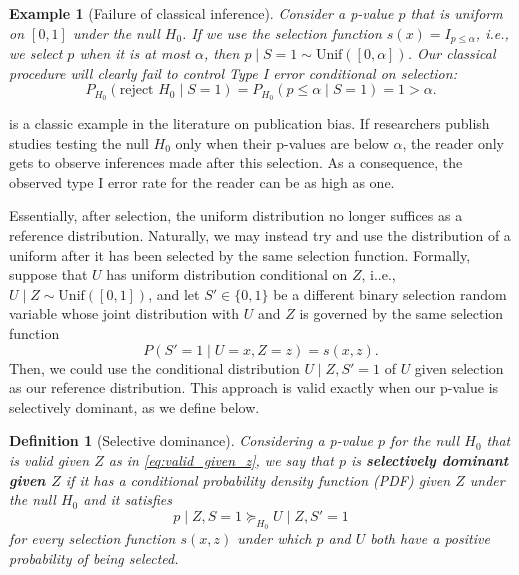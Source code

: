 \documentclass{article}
\newtheorem{example}{Example}
\newtheorem{definition}{Definition}
\begin{document}
\begin{example}[Failure of classical inference]
\label{exm:publication_bias}
Consider a p-value $p$ that is uniform on $[0, 1]$ under the null $H_0$. If we use the selection function $s(x) = I_{p \leq \alpha}$, i.e., we select $p$ when it is at most $\alpha$, then $p \mid S=1 \sim \text{Unif}([0, \alpha])$. Our classical procedure will clearly fail to control Type I error conditional on selection:
\begin{equation*}
    P_{H_0}(\text{reject } H_0 \mid S=1) = P_{H_0}(p \leq \alpha \mid S=1) = 1 > \alpha. 
\end{equation*}
\end{example}

 is a classic example in the literature on publication bias. If researchers publish studies testing the null $H_0$ only when their p-values are below $\alpha$, the reader only gets to observe inferences made after this selection. As a consequence, the observed type I error rate for the reader can be as high as one. 

Essentially, after selection, the uniform distribution no longer suffices as a reference distribution. Naturally, we may instead try and use the distribution of a uniform after it has been selected by the same selection function. Formally, suppose that $U$ has uniform distribution conditional on $Z$, i..e., $U \mid Z \sim \text{Unif}([0, 1])$, and let $S' \in \{0, 1\}$ be a different binary selection random variable whose joint distribution with $U$ and $Z$ is governed by the same selection function 
\begin{equation*}
     P(S' = 1 \mid U = x, Z=z ) = s(x, z).
\end{equation*}
Then, we could use the conditional distribution $U \mid Z,  S' = 1$ of $U$ given selection as our reference distribution. This approach is valid exactly when our p-value is selectively dominant, as we define below. 

\begin{definition}[Selective dominance]
    \label{def:selective_dominance}
    Considering a p-value $p$ for the null $H_0$ that is valid given $Z$ as in \eqref{eq:valid_given_z}, we say that $p$ is \textbf{selectively dominant given $Z$} if it has a conditional probability density function (PDF) given $Z$ under the null $H_0$ and it satisfies 
    \begin{equation}
    \label{eq:selective_dominance}
    p \mid Z, S = 1 \succeq_{H_0} U \mid Z, S' = 1
    \end{equation}
    for every selection function $s(x, z)$ under which $p$ and $U$ both have a positive probability of being selected. 
\end{definition}
\end{document}
